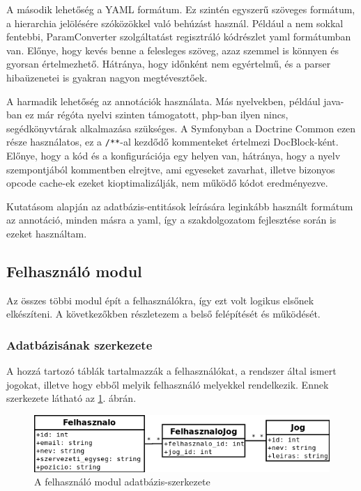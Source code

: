 \documentclass[a4paper,12pt,oneside]{report}
\begin{document}
A második lehetőség a YAML formátum. Ez szintén egyszerű szöveges formátum, a hierarchia jelölésére szóközökkel való behúzást használ. Például a nem sokkal fentebbi, ParamConverter szolgáltatást regisztráló kódrészlet yaml formátumban van. Előnye, hogy kevés benne a felesleges szöveg, azaz szemmel is könnyen és gyorsan értelmezhető. Hátránya, hogy időnként nem egyértelmű, és a parser hibaüzenetei is gyakran nagyon megtévesztőek.

A harmadik lehetőség az annotációk használata. Más nyelvekben, például java-ban ez már régóta nyelvi szinten támogatott, php-ban ilyen nincs, segédkönyvtárak alkalmazása szükséges. A Symfonyban a Doctrine Common ezen része használatos, ez a \lstinline!/**!-al kezdődő kommenteket értelmezi DocBlock-ként. Előnye, hogy a kód és a konfigurációja egy helyen van, hátránya, hogy a nyelv szempontjából kommentben elrejtve, ami egyeseket zavarhat, illetve bizonyos opcode cache-ek ezeket kioptimalizálják, nem működő kódot eredményezve.

Kutatásom alapján az adatbázis-entitások leírására leginkább használt formátum az annotáció, minden másra a yaml, így a szakdolgozatom fejlesztése során is ezeket használtam.

\subsection{Felhasználó modul}

Az összes többi modul épít a felhasználókra, így ezt volt logikus elsőnek elkészíteni. A következőkben részletezem a belső felépítését és működését.

\subsubsection*{Adatbázisának szerkezete}

A hozzá tartozó táblák tartalmazzák a felhasználókat, a rendszer által ismert jogokat, illetve hogy ebből melyik felhasználó melyekkel rendelkezik. Ennek szerkezete látható az \ref{fig:felhasznalo_db}. ábrán.

\begin{figure}[h]
  \includegraphics[width=\textwidth]{felhasznalo_db.png}
  \caption{A felhasználó modul adatbázis-szerkezete}
  \label{fig:felhasznalo_db}
\end{figure}
\end{document}
